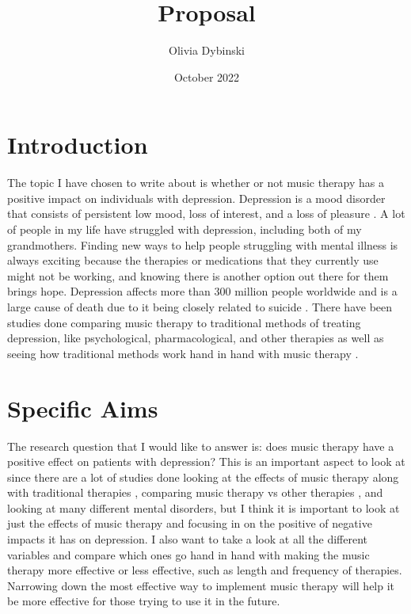 \documentclass[12pt]{article}
\title{Proposal}
\author{Olivia Dybinski\\}
\date{October 2022}
\begin{document}
 \maketitle


 \section{Introduction} 
 \label{sec:intro}

 The topic I have chosen to write about is whether or not music therapy has a positive impact on individuals with depression. Depression is a mood disorder that consists of persistent low mood, loss of interest, and a loss of pleasure \cite{Cochrane}. A lot of people in my life have struggled with depression, including both of my grandmothers. Finding new ways to help people struggling with mental illness is always exciting because the therapies or medications that they currently use might not be working, and knowing there is another option out there for them brings hope. Depression affects more than 300 million people worldwide and is a large cause of death due to it being closely related to suicide \cite{PLOS}. There have been studies done comparing music therapy to traditional methods of treating depression, like psychological, pharmacological, and other therapies \cite{Cochrane} as well as seeing how traditional methods work hand in hand with music therapy \cite{British}.

 \section{Specific Aims}
 \label{sec:aims}

 The research question that I would like to answer is: does music therapy have a positive effect on patients with depression? This is an important aspect to look at since there are a lot of studies done looking at the effects of music therapy along with traditional therapies \cite{British}, comparing music therapy vs other therapies \cite{Cochrane}, and looking at many different mental disorders, but I think it is important to look at just the effects of music therapy and focusing in on the positive of negative impacts it has on depression. I also want to take a look at all the different variables and compare which ones go hand in hand with making the music therapy more effective or less effective, such as length and frequency of therapies. Narrowing down the most effective way to implement music therapy will help it be more effective for those trying to use it in the future.
\end{document}
